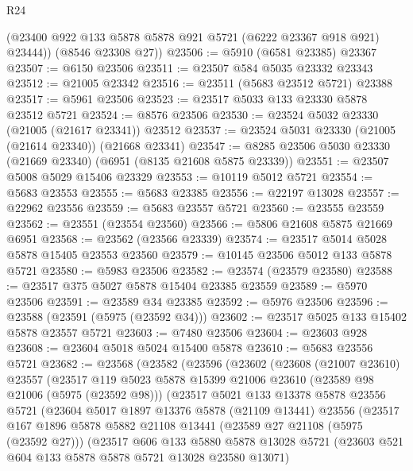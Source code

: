 \begin{lexlean}{R24}
\begin{coremodule}
        (@23400 @922 @133 @5878 @5878 @921 @5721 (@6222 @23367 @918 @921) @23444))
      (@8546 @23308 @27))
@23506 := @5910 (@6581 @23385) @23367
@23507 := @6150 @23506
@23511 := @23507 @584 @5035 @23332 @23343
@23512 := @21005 @23342
@23516 := @23511 (@5683 @23512 @5721) @23388
@23517 := @5961 @23506
@23523 := @23517 @5033 @133 @23330 @5878 @23512 @5721
@23524 := @8576 @23506
@23530 := @23524 @5032 @23330 (@21005 (@21617 @23341)) @23512
@23537 := @23524 @5031 @23330 (@21005 (@21614 @23340)) (@21668 @23341)
@23547 := @8285 @23506 @5030 @23330 (@21669 @23340) (@6951 (@8135 @21608 @5875 @23339))
@23551 := @23507 @5008 @5029 @15406 @23329
@23553 := @10119 @5012 @5721
@23554 := @5683 @23553
@23555 := @5683 @23385
@23556 := @22197 @13028
@23557 := @22962 @23556
@23559 := @5683 @23557 @5721
@23560 := @23555 @23559
@23562 := @23551 (@23554 @23560)
@23566 := @5806 @21608 @5875 @21669 @6951
@23568 := @23562 (@23566 @23339)
@23574 := @23517 @5014 @5028 @5878 @15405 @23553 @23560
@23579 := @10145 @23506 @5012 @133 @5878 @5721
@23580 := @5983 @23506
@23582 := @23574 (@23579 @23580)
@23588 := @23517 @375 @5027 @5878 @15404 @23385 @23559
@23589 := @5970 @23506
@23591 := @23589 @34 @23385
@23592 := @5976 @23506
@23596 := @23588 (@23591 (@5975 (@23592 @34)))
@23602 := @23517 @5025 @133 @15402 @5878 @23557 @5721
@23603 := @7480 @23506
@23604 := @23603 @928
@23608 := @23604 @5018 @5024 @15400 @5878
@23610 := @5683 @23556 @5721
@23682 := @23568
    (@23582
      (@23596
        (@23602
          (@23608
            (@21007 @23610)
            @23557
            (@23517
              @119
              @5023
              @5878
              @15399
              @21006
              @23610
              (@23589 @98 @21006 (@5975 (@23592 @98)))
              (@23517
                @5021
                @133
                @13378
                @5878
                @23556
                @5721
                (@23604
                  @5017
                  @1897
                  @13376
                  @5878
                  (@21109 @13441)
                  @23556
                  (@23517
                    @167
                    @1896
                    @5878
                    @5882
                    @21108
                    @13441
                    (@23589 @27 @21108 (@5975 (@23592 @27)))
                    (@23517
                      @606
                      @133
                      @5880
                      @5878
                      @13028
                      @5721
                      (@23603 @521 @604 @133 @5878 @5878 @5721 @13028 @23580 @13071)

\end{coremodule}
\end{lexlean}
